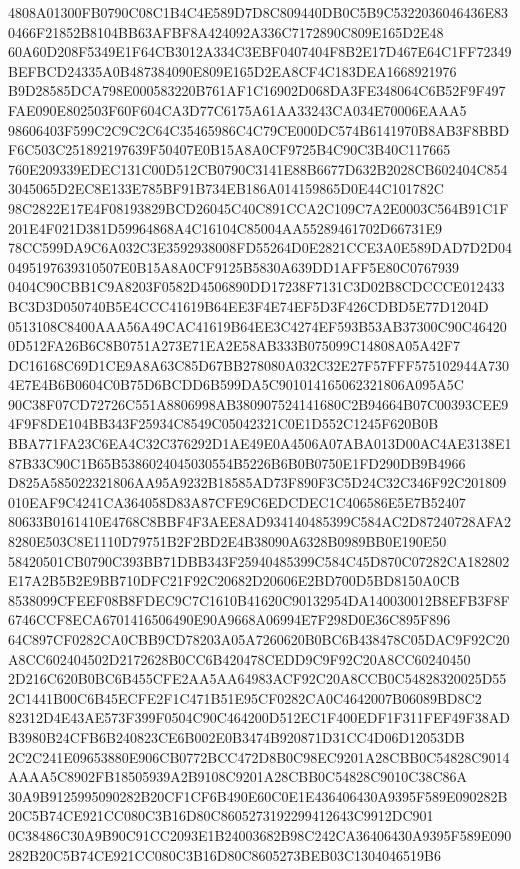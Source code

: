 \documentclass[UTF8,fontset=fandol,zihao=-4,a4paper]{ctexart}
\begin{document}
{{4808A01300FB0790C08C1B4C4E589D7D8C809440DB0C5B9C5322036046436E830466F21852B8104BB63AFBF8A424092A336C7172890C809E165D2E48
60A60D208F5349E1F64CB3012A334C3EBF0407404F8B2E17D467E64C1FF72349BEFBCD24335A0B487384090E809E165D2EA8CF4C183DEA1668921976
B9D28585DCA798E000583220B761AF1C16902D068DA3FE348064C6B52F9F497FAE090E802503F60F604CA3D77C6175A61AA33243CA034E70006EAAA5
98606403F599C2C9C2C64C35465986C4C79CE000DC574B6141970B8AB3F8BBDF6C503C251892197639F50407E0B15A8A0CF9725B4C90C3B40C117665
760E209339EDEC131C00D512CB0790C3141E88B6677D632B2028CB602404C8543045065D2EC8E133E785BF91B734EB186A014159865D0E44C101782C
98C2822E17E4F08193829BCD26045C40C891CCA2C109C7A2E0003C564B91C1F201E4F021D381D59964868A4C16104C85004AA55289461702D66731E9
78CC599DA9C6A032C3E3592938008FD55264D0E2821CCE3A0E589DAD7D2D040495197639310507E0B15A8A0CF9125B5830A639DD1AFF5E80C0767939
0404C90CBB1C9A8203F0582D4506890DD17238F7131C3D02B8CDCCCE012433BC3D3D050740B5E4CCC41619B64EE3F4E74EF5D3F426CDBD5E77D1204D
0513108C8400AAA56A49CAC41619B64EE3C4274EF593B53AB37300C90C464200D512FA26B6C8B0751A273E71EA2E58AB333B075099C14808A05A42F7
DC16168C69D1CE9A8A63C85D67BB278080A032C32E27F57FFF575102944A7304E7E4B6B0604C0B75D6BCDD6B599DA5C901014165062321806A095A5C
90C38F07CD72726C551A8806998AB380907524141680C2B94664B07C00393CEE94F9F8DE104BB343F25934C8549C05042321C0E1D552C1245F620B0B
BBA771FA23C6EA4C32C376292D1AE49E0A4506A07ABA013D00AC4AE3138E187B33C90C1B65B5386024045030554B5226B6B0B0750E1FD290DB9B4966
D825A585022321806AA95A9232B18585AD73F890F3C5D24C32C346F92C201809010EAF9C4241CA364058D83A87CFE9C6EDCDEC1C406586E5E7B52407
80633B0161410E4768C8BBF4F3AEE8AD934140485399C584AC2D87240728AFA28280E503C8E1110D79751B2F2BD2E4B38090A6328B0989BB0E190E50
58420501CB0790C393BB71DBB343F25940485399C584C45D870C07282CA182802E17A2B5B2E9BB710DFC21F92C20682D20606E2BD700D5BD8150A0CB
8538099CFEEF08B8FDEC9C7C1610B41620C90132954DA140030012B8EFB3F8F6746CCF8ECA6701416506490E90A9668A06994E7F298D0E36C895F896
64C897CF0282CA0CBB9CD78203A05A7260620B0BC6B438478C05DAC9F92C20A8CC602404502D2172628B0CC6B420478CEDD9C9F92C20A8CC60240450
2D216C620B0BC6B455CFE2AA5AA64983ACF92C20A8CCB0C54828320025D552C1441B00C6B45ECFE2F1C471B51E95CF0282CA0C4642007B06089BD8C2
82312D4E43AE573F399F0504C90C464200D512EC1F400EDF1F311FEF49F38ADB3980B24CFB6B240823CE6B002E0B3474B920871D31CC4D06D12053DB
2C2C241E09653880E906CB0772BCC472D8B0C98EC9201A28CBB0C54828C9014AAAA5C8902FB18505939A2B9108C9201A28CBB0C54828C9010C38C86A
30A9B9125995090282B20CF1CF6B490E60C0E1E436406430A9395F589E090282B20C5B74CE921CC080C3B16D80C8605273192299412643C9912DC901
0C38486C30A9B90C91CC2093E1B24003682B98C242CA36406430A9395F589E090282B20C5B74CE921CC080C3B16D80C8605273BEB03C1304046519B6
}}
\end{document}
